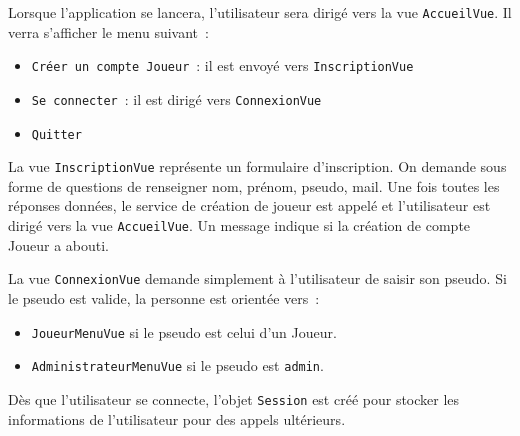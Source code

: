 \documentclass[11pt]{article}
\begin{document}
\bigbreak

Lorsque l'application se lancera, l'utilisateur sera dirigé vers la vue \texttt{AccueilVue}. Il verra s'afficher le menu suivant~:
\begin{itemize}[label=, font=\small]
    \item \texttt{Créer un compte Joueur}~: il est envoyé vers \texttt{InscriptionVue}
    \item \texttt{Se connecter}~: il est dirigé vers \texttt{ConnexionVue}
    \item \texttt{Quitter}
\end{itemize}

\bigbreak

La vue \texttt{InscriptionVue} représente un formulaire d'inscription. On demande sous forme de questions de renseigner nom, prénom, pseudo, mail. Une fois toutes les réponses données, le service de création de joueur est appelé et l'utilisateur est dirigé vers la vue \texttt{AccueilVue}. Un message indique si la création de compte Joueur a abouti. 

La vue \texttt{ConnexionVue} demande simplement à l'utilisateur de saisir son pseudo. Si le pseudo est valide, la personne est orientée vers~:
\begin{itemize}[label=, font=\small]
    \item \texttt{JoueurMenuVue} si le pseudo est celui d'un Joueur.
    \item \texttt{AdministrateurMenuVue} si le pseudo est \texttt{admin}.
\end{itemize}

Dès que l'utilisateur se connecte, l'objet \texttt{Session} est créé pour stocker les informations de l'utilisateur pour des appels ultérieurs.
\bigbreak
\end{document}
